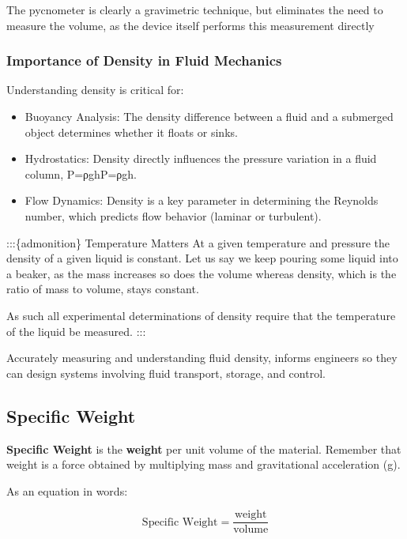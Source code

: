 \documentclass[11pt]{article}
\providecommand{\tightlist}{%
      \setlength{\itemsep}{0pt}\setlength{\parskip}{0pt}}
\begin{document}
The pycnometer is clearly a gravimetric technique, but eliminates the
need to measure the volume, as the device itself performs this
measurement directly

\hypertarget{importance-of-density-in-fluid-mechanics}{%
\subsubsection{Importance of Density in Fluid
Mechanics}\label{importance-of-density-in-fluid-mechanics}}

Understanding density is critical for:

\begin{itemize}
\tightlist
\item
  Buoyancy Analysis: The density difference between a fluid and a
  submerged object determines whether it floats or sinks.
\item
  Hydrostatics: Density directly influences the pressure variation in a
  fluid column, P=ρghP=ρgh.
\item
  Flow Dynamics: Density is a key parameter in determining the Reynolds
  number, which predicts flow behavior (laminar or turbulent).
\end{itemize}

:::\{admonition\} Temperature Matters At a given temperature and
pressure the density of a given liquid is constant. Let us say we keep
pouring some liquid into a beaker, as the mass increases so does the
volume whereas density, which is the ratio of mass to volume, stays
constant.

As such all experimental determinations of density require that the
temperature of the liquid be measured. :::

Accurately measuring and understanding fluid density, informs engineers
so they can design systems involving fluid transport, storage, and
control.

    \hypertarget{specific-weight}{%
\subsection{Specific Weight}\label{specific-weight}}

\textbf{Specific Weight} is the \textbf{weight} per unit volume of the
material. Remember that weight is a force obtained by multiplying mass
and gravitational acceleration (g).

As an equation in words:

\[\text{Specific Weight} = \frac{\text{weight}}{\text{volume}}\]
\end{document}
